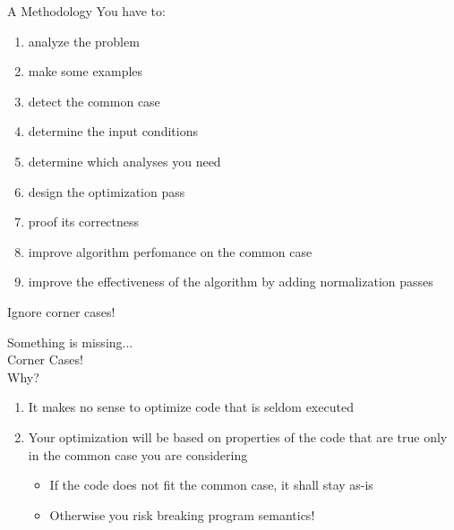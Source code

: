\begin{frame}{A Methodology}
You have to:

\begin{enumerate}
\item analyze the problem
\item make some examples
\item detect the common case
\item determine the \alert{input conditions}
\item determine which \alert{analyses} you need
\item design the \alert{optimization} pass
\item proof its \alert{correctness}
\item improve algorithm perfomance on the common case
\item improve the effectiveness of the algorithm by adding
      \alert{normalization passes}
\end{enumerate}
\end{frame}


\begin{frame}{Ignore corner cases!}
\begin{center}
Something is missing...\\
\bigskip
{\Large Corner Cases!}\\
\bigskip
Why?\\
\end{center}
\begin{enumerate}
\item It makes no sense to optimize code that is seldom executed
\item Your optimization will be based on \alert{properties of the code that are true only in the common case you are considering}
\begin{itemize}
\item If the code does not fit the common case, it shall stay as-is
\item Otherwise you \alert{risk breaking program semantics}!
\end{itemize}
\end{enumerate}
\end{frame}

